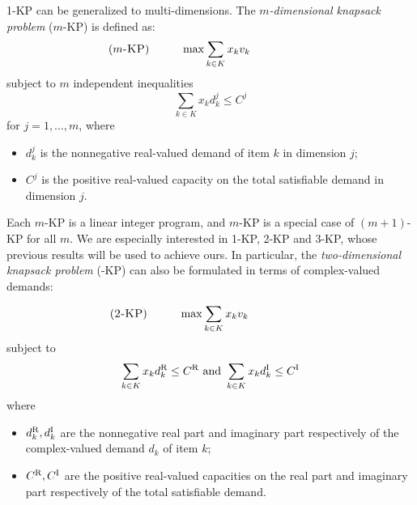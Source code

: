 \documentclass{aamas2013}
\begin{document}
1-KP can be generalized to multi-dimensions.  The {\em $m$-dimensional knapsack problem} ({\sc $m$-KP}) is defined as: \begin{equation*}
\begin{array}{@{}lc} \hspace{-50pt}
\mbox{({\sc $m$-KP})} & \displaystyle \qquad \max \sum_{k \in K} x_k v_k \end{array}
\end{equation*}
subject to $m$ independent inequalities\begin{equation*}
\sum_{k \in K} x_k d^j_k \le C^j \end{equation*}
for $j=1,\ldots, m$, where 
\begin{itemize}

\item $d^j_k$ is the nonnegative real-valued demand of item $k$ in dimension $j$;

\item $C^j$ is the positive real-valued capacity on the total satisfiable demand in dimension $j$.

\end{itemize}
Each $m$-KP is a linear integer program, and $m$-KP is a special case of $(m+1)$-KP for all $m$.  We are especially interested in 1-KP, 2-KP and 3-KP, whose previous results will be used to achieve ours.  In particular, the {\em two-dimensional knapsack problem} ({-KP}) can also be formulated in terms of complex-valued demands:



\begin{equation*}
\begin{array}{@{}lc} \hspace{-50pt}
\mbox{({\sc 2-KP})} & \displaystyle \qquad \max \sum_{k \in K} x_k v_k \end{array}
\end{equation*}
subject to \begin{equation*}
\sum_{k \in K} x_k d_k^{\rm R} \le C^{\rm R} \mbox{\ and\ } \sum_{k \in K} x_k d_k^{\rm I} \le C^{\rm I} 
\end{equation*}
where 
\begin{itemize}

\item $d^{\rm R}_k, d^{\rm I}_k$ are the nonnegative real part and imaginary part respectively of the complex-valued demand $d_k$ of item $k$;

\item $C^{\rm R}, C^{\rm I}$ are the positive real-valued capacities on the real part and imaginary part respectively of the total satisfiable demand.
\end{itemize}
\end{document}
